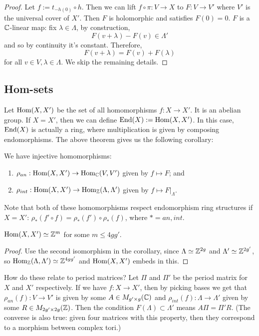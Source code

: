 \begin{proof}
Let $f:=t_{-h(0)}\circ h$. Then we can lift $f\circ \pi: V\to X$ to $F:V\to V'$ where $V'$ is the universal cover of $X'$. Then $F$ is holomorphic and satisfies $F(0)=0$. $F$ is a ${\mathbb C}$-linear map: fix $\lambda\in \Lambda$, by construction,
$$F(v+\lambda)-F(v)\in \Lambda'$$
and so by continuity it's constant. Therefore,
$$F(v+\lambda)= F(v)+F(\lambda)$$
for all $v\in V, \lambda\in \Lambda$. We skip the remaining details.
\end{proof}


\subsection{Hom-sets}
Let $\operatorname{Hom}(X,X')$ be the set of all homomorphisms $f:X\to X'$. It is an abelian group. If $X=X'$, then we can define $\operatorname{End}(X):=\operatorname{Hom}(X,X')$. In this case, $\operatorname{End}(X)$ is actually a ring, where multiplication is given by composing endomorphisms. The above theorem gives us the following corollary:

\begin{corollary}
We have injective homomorphisms:
\begin{enumerate}
\item $\rho_{an}:\operatorname{Hom}(X,X')\to \operatorname{Hom}_{\mathbb C} (V,V')$ given by $f\mapsto F$; and
\item $\rho_{int}: \operatorname{Hom}(X,X')\to \operatorname{Hom}_{\mathbb Z}(\Lambda,\Lambda')$ given by $f\mapsto F|_\Lambda$.
\end{enumerate}
\end{corollary}

Note that both of these homomorphisms respect endomorphism ring structures if $X=X'$: $\rho_*(f'\circ f)=\rho_*(f')\circ \rho_*(f)$, where $*=an, int$.

\begin{theorem}
$\operatorname{Hom}(X,X')\simeq {\mathbb Z}^m$ for some $m\leq 4gg'$.
\end{theorem}

\begin{proof}
Use the second isomorphism in the corollary, since $\Lambda\simeq {\mathbb Z}^{2g}$ and $\Lambda'\simeq {\mathbb Z}^{2g'}$, so  $\operatorname{Hom}_{\mathbb Z}(\Lambda,\Lambda')\simeq {\mathbb Z}^{4gg'}$ and $\operatorname{Hom}(X,X')$ embeds in this.
\end{proof}

How do these relate to period matrices?
Let $\Pi$ and $\Pi'$ be the period matrix for $X$ and $X'$ respectively. If we have $f:X\to X'$, then by picking bases we get that $\rho_{an}(f):V\to V'$ is given by some $A\in M_{g'\times g}({\mathbb C})$ and $\rho_{int}(f):\Lambda\to \Lambda'$ given by some $R\in M_{2g'\times 2g}({\mathbb Z})$. Then the condition $F(\Lambda)\subset \Lambda'$ means $A\Pi=\Pi'R$. (The converse is also true: given four matrices with this property, then they correspond to a morphism between complex tori.) 

